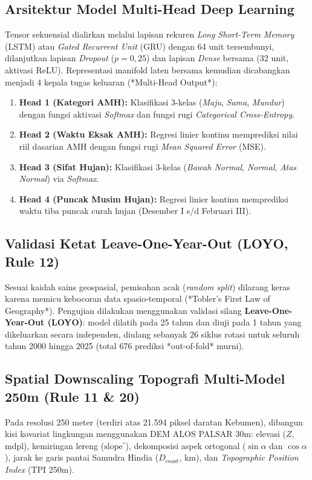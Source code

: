 \documentclass[11pt,a4paper]{article}
\begin{document}
\subsection{Arsitektur Model Multi-Head Deep Learning}
Tensor sekuensial dialirkan melalui lapisan rekuren \textit{Long Short-Term Memory} (LSTM) atau \textit{Gated Recurrent Unit} (GRU) dengan 64 unit tersembunyi, dilanjutkan lapisan \textit{Dropout} ($p=0,25$) dan lapisan \textit{Dense} bersama (32 unit, aktivasi ReLU). Representasi manifold laten bersama kemudian dicabangkan menjadi 4 kepala tugas keluaran (*Multi-Head Output*):
\begin{enumerate}
    \item \textbf{Head 1 (Kategori AMH):} Klasifikasi 3-kelas (\textit{Maju}, \textit{Sama}, \textit{Mundur}) dengan fungsi aktivasi \textit{Softmax} dan fungsi rugi \textit{Categorical Cross-Entropy}.
    \item \textbf{Head 2 (Waktu Eksak AMH):} Regresi linier kontinu memprediksi nilai riil dasarian AMH dengan fungsi rugi \textit{Mean Squared Error} (MSE).
    \item \textbf{Head 3 (Sifat Hujan):} Klasifikasi 3-kelas (\textit{Bawah Normal}, \textit{Normal}, \textit{Atas Normal}) via \textit{Softmax}.
    \item \textbf{Head 4 (Puncak Musim Hujan):} Regresi linier kontinu memprediksi waktu tiba puncak curah hujan (Desember I s/d Februari III).
\end{enumerate}

\subsection{Validasi Ketat Leave-One-Year-Out (LOYO, Rule 12)}
Sesuai kaidah sains geospasial, pemisahan acak (\textit{random split}) dilarang keras karena memicu kebocoran data spasio-temporal (*Tobler's First Law of Geography*). Pengujian dilakukan menggunakan validasi silang \textbf{Leave-One-Year-Out (LOYO)}: model dilatih pada 25 tahun dan diuji pada 1 tahun yang dikeluarkan secara independen, diulang sebanyak 26 siklus rotasi untuk seluruh tahun 2000 hingga 2025 (total 676 prediksi *out-of-fold* murni).

\subsection{Spatial Downscaling Topografi Multi-Model 250m (Rule 11 \& 20)}
Pada resolusi 250 meter (terdiri atas 21.594 piksel daratan Kebumen), dibangun kisi kovariat lingkungan menggunakan DEM ALOS PALSAR 30m: elevasi ($Z$, mdpl), kemiringan lereng ($\text{slope}^\circ$), dekomposisi aspek ortogonal ($\sin\alpha$ dan $\cos\alpha$), jarak ke garis pantai Samudra Hindia ($D_{\text{coast}}$, km), dan \textit{Topographic Position Index} (TPI 250m).
\end{document}
